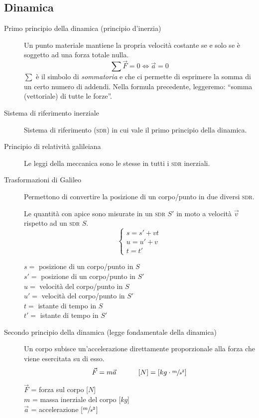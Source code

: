 \documentclass[a4paper,11pt,italian]{article}
\begin{document}
\subsection{Dinamica}
\begin{description}
  \item[Primo principio della dinamica (principio d'inerzia)] 
  Un punto materiale mantiene la propria velocità costante se e solo se è soggetto ad una forza totale nulla.\[ \sum \vec{F} = 0 \Longleftrightarrow \vec{a}= 0 \]
  $ \sum $ è il simbolo di \emph{sommatoria} e che ci permette di esprimere la somma di un certo numero di addendi. Nella formula precedente, leggeremo: ``somma (vettoriale) di tutte le forze''.
  
  \item[Sistema di riferimento inerziale] 
  Sistema di riferimento (\textsc{sdr}) in cui vale il primo principio della dinamica.
  
  \item[Principio di relatività galileiana] 
  Le leggi della meccanica sono le stesse in tutti i \textsc{sdr} inerziali.
  
  \item[Trasformazioni di Galileo] 
  Permettono di convertire la posizione di un corpo/punto in due diversi \textsc{sdr}.
  
  Le quantità con apice sono misurate in un \textsc{sdr} $ S' $ in moto a velocità $ \vec{v} $ rispetto ad un \textsc{sdr} $ S $.
  \[
  \left\{ 
  \begin{array}{l}
  s = s' + vt\\
  u = u' + v\\
  t = t'
  \end{array}
  \right. 
  \]
  \begin{multicols}{2}
  $ s = $ posizione di un corpo/punto in $ S $ \\
  $ s' = $ posizione di un corpo/punto in $ S' $ \\
  $ u = $ velocità del corpo/punto in $ S $\\
  $ u' = $ velocità del corpo/punto in $ S' $\\
  $ t = $ istante di tempo in $ S $\\
  $ t' = $ istante di tempo in $ S' $
  \end{multicols}
  
  \item[Secondo principio della dinamica (legge fondamentale della dinamica)] 
  Un corpo subisce un'accelerazione direttamente proporzionale alla forza che viene esercitata su di esso.
  \[ \vec{F} = m  \vec{a}   \hspace*{3em} \left[ N \right] = \left[ kg \cdot \sfrac{m}{s^2} \right] \]
  \begin{multicols}{2}
  $ \vec{F}  $ = forza sul corpo [$ N $]\\
  $ m $ = massa inerziale del corpo [$ kg $]\\
  $ \vec{a}  $ = accelerazione [$ \sfrac{m}{s^2} $]
  \end{multicols}
  

\end{description}
\end{document}
